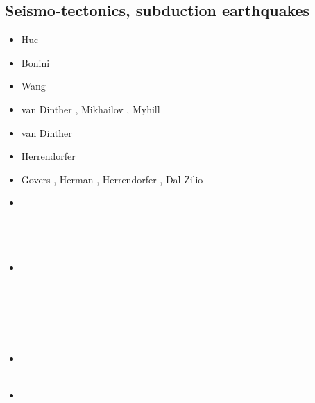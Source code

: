 \subsection{Seismo-tectonics, subduction earthquakes}

\begin{scriptsize}
\begin{itemize}
\item[\nineteenninetyeight] Huc \etal \cite{huhc98}
\item[\twothousandthree] Bonini \etal \cite{bocs03}
\item[\twothousandtwelve] Wang \etal \cite{wahh12}
\item[\twothousandthirteen] van Dinther \etal \cite{vagd13a,vagd13b}, Mikhailov \cite{milp13},
                            Myhill \cite{myhi13}
\item[\twothousandfourteen] van Dinther \etal \cite{vamd14}
\item[\twothousandfifteen] Herrendorfer \etal \cite{hevg15}
\item[\twothousandeighteen] Govers \etal \cite{gofv18}, Herman \etal \cite{hefg18}, 
                            Herrendorfer \etal \cite{hegv18}, Dal Zilio \etal \cite{davg18}
\item[\twothousandnineteen] 
\textcite{vawg19} \\ 
\textcite{vanzelst} \\
\textcite{vakf19} \\
\textcite{davg19} \\
\item[\twothousandtwenty] 
\textcite{brvf20} \\
\textcite{pegy20} \\
\textcite{dadm20} \\
\textcite{mabb20} \\
\textcite{hego20} \\
\textcite{soca20} \\
\item[\twothousandtwentyone] 
\textcite{jamp21} \\
\textcite{begc21} \\
\item[\twothousandtwentytwo] 
\textcite{toyp22} \\
\textcite{dage22} \\
\textcite{dala22} \\
\textcite{zugc22} 
\end{itemize}
\end{scriptsize}

